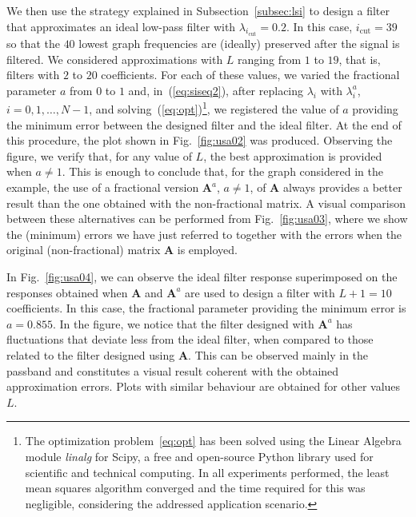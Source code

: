 We then use the strategy explained in Subsection~\ref{subsec:lsi} to design a filter that approximates an ideal low-pass filter with $\lambda_{i_\text{cut}}=0.2$. In this case, $i_\text{cut}=39$ so that the $40$ lowest graph frequencies are (ideally) preserved after the signal is filtered. We considered approximations with $L$ ranging from $1$ to $19$, that is, filters with $2$ to $20$ coefficients. For each of these values, we varied the fractional parameter $a$ from $0$ to $1$ and, in~(\ref{eq:siseq2}), after replacing $\lambda_i$ with $\lambda_i^a$, $i=0,1,\ldots,N-1$, and solving~(\ref{eq:opt})\footnote{The optimization problem~\ref{eq:opt} has been solved using the Linear Algebra module \emph{linalg} for Scipy, a free and open-source Python library used for scientific and technical computing. In all experiments performed, the least mean squares algorithm converged and the time required for this was negligible, considering the addressed application scenario.}, we registered the value of $a$ providing the minimum error between the designed filter and the ideal filter. At the end of this procedure, the plot shown in Fig.~\ref{fig:usa02} was produced. Observing the figure, we verify that, for any value of $L$, the best approximation is provided when $a\neq1$. This is enough to conclude that, for the graph considered in the example, the use of a fractional version $\mathbf{A}^a$, $a\neq 1$, of $\mathbf{A}$ always provides a better result than the one obtained with the non-fractional matrix. A visual comparison between these alternatives can be performed from Fig.~\ref{fig:usa03}, where we show the (minimum) errors we have just referred to together with the errors when the original (non-fractional) matrix $\mathbf{A}$ is employed.

In Fig.~\ref{fig:usa04}, we can observe the ideal filter response superimposed on the responses obtained when $\mathbf{A}$ and $\mathbf{A}^a$ are used to design a filter with $L+1=10$ coefficients. In this case, the fractional parameter providing the minimum error is $a=0.855$. In the figure, we notice that the filter designed with $\mathbf{A}^a$ has fluctuations that deviate less from the ideal filter, when compared to those related to the filter designed using $\mathbf{A}$. This can be observed mainly in the passband and constitutes a visual result coherent with the obtained approximation errors. Plots with similar behaviour are obtained for other values $L$.

